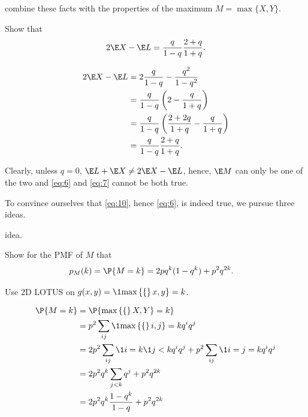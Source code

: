 \documentclass[a4paper]{article}
\begin{document}
 combine these facts with the properties of the maximum \(M=\max\{X, Y\}\).

\begin{exercise}
Show that
\begin{equation*}
\label{eq:10}
2\E X  -\E L = \frac q{1-q} \frac{2+q}{1+q}.
\end{equation*}
\begin{solution}
  \begin{align*}
2\E X - \E L
&= 2\frac q{1-q}  - \frac{q^2}{1-q^2}\\
&= \frac q{1-q}\left(2  - \frac{q}{1+q}\right)\\
&= \frac q{1-q}\left(\frac{2+2q}{1+q}  - \frac{q}{1+q}\right)\\
&= \frac q{1-q}\frac{2+q}{1+q}.
  \end{align*}
\end{solution}
\end{exercise}

Clearly, unless \(q=0\), \(\E L + \E X \neq 2\E X - \E L\), hence, \(\E M\) can only be one of the two and  \cref{eq:6} and \cref{eq:7} cannot be both true.

To convince ourselves that \cref{eq:10}, hence \cref{eq:6}, is indeed true, we pursue  three ideas.

 idea.

\begin{exercise}
Show for the PMF of \(M\) that
\begin{align*}
p_M(k) &= \P{M=k} = 2 pq^{k}(1-q^{k}) + p^2q^{2k}.
\end{align*}
\begin{hint}
Use 2D LOTUS on \(g(x,y) = \1{\max\{x, y\} = k}\).
\end{hint}
\begin{solution}
  \begin{align*}
\P{M=k}
&= \P{\max\{X, Y\} = k} \\
&=p^{2}\sum_{ij}\1{\max\{i,j\} =k} q^i q^j\\
&=2 p^{2}\sum_{ij}\1{i=k}\1{j < k} q^i q^j + p^{2}\sum_{ij}\1{i=j=k} q^{i} q^j \\
&=2 p^{2}q^{k}\sum_{j < k} q^j + p^{2}q^{2k}\\
&=2 p^{2}q^{k}\frac{1-q^{k}}{1-q} +  p^{2}q^{2k}\\
  \end{align*}
\end{solution}
\label{ex:1}
\end{exercise}
\end{document}
